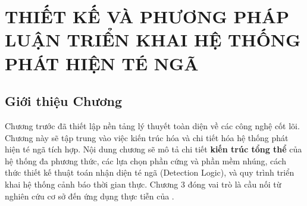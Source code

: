 \chapter[THIẾT KẾ HỆ THỐNG]{THIẾT KẾ VÀ PHƯƠNG PHÁP LUẬN TRIỂN KHAI HỆ THỐNG PHÁT HIỆN TÉ NGÃ}
\label{chap:methodology} %

\section*{Giới thiệu Chương} %
Chương trước đã thiết lập nền tảng lý thuyết toàn diện về các công nghệ cốt lõi. Chương này sẽ tập trung vào việc kiến trúc hóa và chi tiết hóa hệ thống phát hiện té ngã tích hợp. Nội dung chương sẽ mô tả chi tiết \textbf{kiến trúc tổng thể} của hệ thống đa phương thức, các lựa chọn phần cứng và phần mềm nhúng, cách thức thiết kế thuật toán nhận diện té ngã (Detection Logic), và quy trình triển khai hệ thống cảnh báo thời gian thực. Chương 3 đóng vai trò là cầu nối từ nghiên cứu cơ sở đến ứng dụng thực tiễn của \TENLUANVAN.






